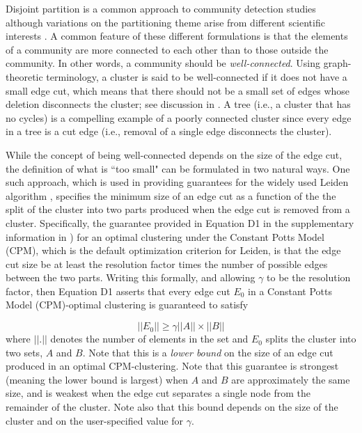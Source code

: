 \documentclass[11pt]{article}   	%
\begin{document}
Disjoint partition is a  common approach to community detection studies \citep{Fortunato2022,Fortunato2010} although variations on the partitioning theme arise from different scientific interests \citep{Coscia2011,Schaub2017}.
A common feature of these different formulations is that  the elements of a community are more connected to each other than to those outside the community. In other words, a community
should be {\em well-connected}.
Using graph-theoretic terminology, a cluster is said to be well-connected if it does not have a small edge cut, which means that there should not be a small set of edges whose deletion
disconnects the cluster; see discussion in \cite{Traag_2019}. A tree  (i.e., a cluster that has no cycles) is  a compelling example of a poorly connected cluster since every edge in  a tree is a cut edge (i.e.,  removal of a single edge
disconnects the cluster).

While the concept of being well-connected depends on the size of the edge cut, the definition of what is ``too small" can be formulated in two natural ways. One such  approach, which is used in
providing guarantees for the widely used Leiden algorithm \citep{Traag_2019}, specifies the minimum size of an edge cut as a function of the the split  of the cluster into two parts produced
when the edge cut is removed from a cluster. Specifically, the guarantee provided   in Equation D1 in the supplementary information in \cite{Traag_2019}) for an optimal clustering under the Constant Potts Model (CPM), which is the default optimization criterion for Leiden, is that the edge cut size be at least the resolution factor   times the number of possible edges between the two  parts. Writing this formally, and allowing $\gamma$ to be the resolution factor, then Equation D1 asserts that every edge cut $E_0$ in a Constant Potts Model (CPM)-optimal clustering is guaranteed to satisfy

 \begin{equation}
 ||E_0|| \geq \gamma ||A|| \times ||B||
 \label{eqn:cpm-bound}
 \end{equation}
where $||.||$ denotes the number of elements in the set and $E_0$ splits the cluster into two sets, $A$ and $B$.
Note that this is a {\em lower bound} on the size of an edge cut produced in an optimal CPM-clustering.
Note  that this guarantee is strongest (meaning the lower bound is largest) when $A$ and $B$ are approximately the same size, and is weakest when the
edge cut separates a single node from the remainder of the cluster. Note also that this bound depends on the size of the cluster and on   the user-specified value for $\gamma$.
\end{document}
